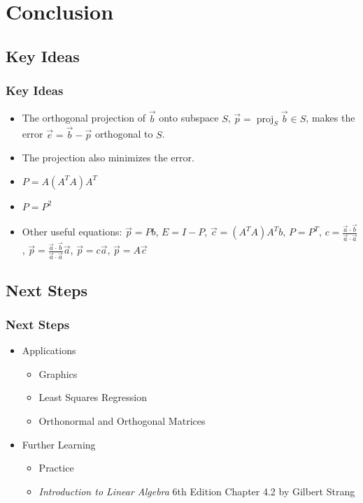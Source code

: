 \documentclass[12pt]{beamer}
\DeclareMathOperator{\proj}{proj}
\begin{document}
\section{Conclusion}

\subsection{Key Ideas}

\begin{frame}
    \frametitle{Key Ideas}

    \begin{itemize}
        \item The orthogonal projection of $\vec{b}$ onto subspace $S$, $\vec{p} = \proj_S \vec{b} \in S$, makes the error $\vec{e} = \vec{b} - \vec{p}$ orthogonal to $S$.
        \item The projection also minimizes the error.
        \item $\boxed{P = A(A^T A)A^T}$ 
        \item $P = P^2$
        \item Other useful equations: $\vec{p} = Pb$, $E = I - P$, $\vec{c} = (A^T A)A^Tb$, $P = P^T$, $c = \frac{\vec{a} \cdot \vec{b}}{\vec{a} \cdot \vec{a}}$, $\vec{p} = \frac{\vec{a} \cdot \vec{b}}{\vec{a} \cdot \vec{a}} \vec{a}$, $\vec{p} = c \vec{a}$, $\vec{p} = A \vec{c}$
    \end{itemize}
\end{frame}

\subsection{Next Steps}

\begin{frame}
    \frametitle{Next Steps}

    \begin{itemize}
        \item Applications
              \begin{itemize}
                  \item Graphics
                  \item Least Squares Regression
                  \item Orthonormal and Orthogonal Matrices
              \end{itemize}
        \item Further Learning
              \begin{itemize}
                  \item Practice
                  \item \textit{Introduction to Linear Algebra} 6th Edition Chapter 4.2 by Gilbert Strang
              \end{itemize}
    \end{itemize}
\end{frame}
\end{document}
